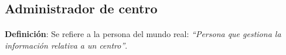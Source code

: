 \subsection{Administrador de centro}

  \paragraph{}\textbf{Definición}: Se refiere a la persona del mundo real:
  \emph{``Persona  que gestiona la información relativa a un centro''}.




